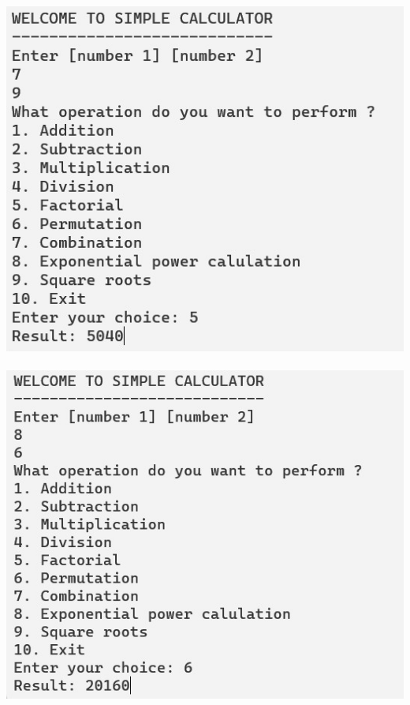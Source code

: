 \documentclass[11pt]{article}
\begin{document}
\includegraphics[scale=0.5]{out3.png}\\ \\
\includegraphics[scale=0.5]{out4.png}\\ \\
\end{document}
